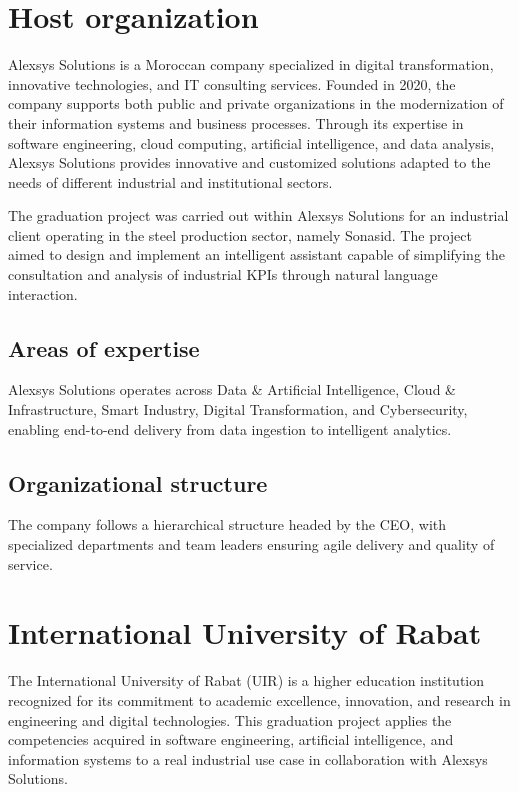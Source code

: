 \section{Host organization}
Alexsys Solutions is a Moroccan company specialized in digital transformation, innovative technologies, and IT consulting services. Founded in 2020, the company supports both public and private organizations in the modernization of their information systems and business processes. Through its expertise in software engineering, cloud computing, artificial intelligence, and data analysis, Alexsys Solutions provides innovative and customized solutions adapted to the needs of different industrial and institutional sectors.

The graduation project was carried out within Alexsys Solutions for an industrial client operating in the steel production sector, namely Sonasid. The project aimed to design and implement an intelligent assistant capable of simplifying the consultation and analysis of industrial KPIs through natural language interaction.

\subsection{Areas of expertise}
Alexsys Solutions operates across Data \& Artificial Intelligence, Cloud \& Infrastructure, Smart Industry, Digital Transformation, and Cybersecurity, enabling end-to-end delivery from data ingestion to intelligent analytics.

\subsection{Organizational structure}
The company follows a hierarchical structure headed by the CEO, with specialized departments and team leaders ensuring agile delivery and quality of service.

\section{International University of Rabat}
The International University of Rabat (UIR) is a higher education institution recognized for its commitment to academic excellence, innovation, and research in engineering and digital technologies. This graduation project applies the competencies acquired in software engineering, artificial intelligence, and information systems to a real industrial use case in collaboration with Alexsys Solutions.

